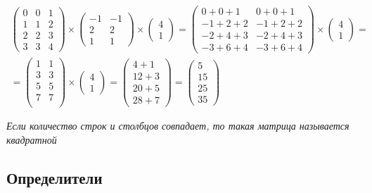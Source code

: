 \documentclass[a4paper, 11pt, oneside]{article}
\begin{document}
\begin{gather*}
	\begin{pmatrix}
		0& 0& 1\\
		1& 1& 2\\
		2& 2& 3\\
		3& 3& 4
	\end{pmatrix}
	\times
	\begin{pmatrix}
		-1& -1\\
		2& 2\\
		1& 1
	\end{pmatrix}
	\times
	\begin{pmatrix}
		4\\
		1
	\end{pmatrix}
	=
	\begin{pmatrix}
		0+0+1& 0+0+1\\
		-1+2+2& -1+2+2\\
		-2+4+3& -2+4+3\\
		-3+6+4& -3+6+4
	\end{pmatrix}
	\times
	\begin{pmatrix}
		4\\
		1
	\end{pmatrix}
	=\\=
	\begin{pmatrix}
		1& 1\\
		3& 3\\
		5& 5\\
		7& 7\\
	\end{pmatrix}
	\times
	\begin{pmatrix}
		4\\
		1
	\end{pmatrix}
	=
	\begin{pmatrix}
		4+1\\
		12+3\\
		20+5\\
		28+7
	\end{pmatrix}
	=
	\begin{pmatrix}
		5\\
		15\\
		25\\
		35
	\end{pmatrix}
\end{gather*}

{\itshape Если количество строк и столбцов совпадает, то такая матрица называется квадратной}


\subsection{Определители}
\end{document}
